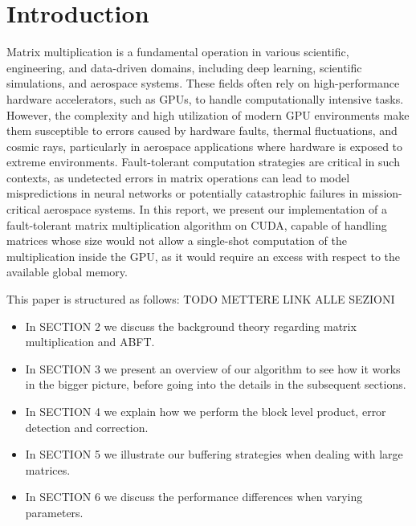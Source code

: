 \section{Introduction}

Matrix multiplication is a fundamental operation
in various scientific, engineering, and data-driven domains,
including deep learning, scientific simulations, and aerospace systems.
These fields often rely on high-performance hardware accelerators, such as GPUs,
to handle computationally intensive tasks.
However, the complexity and high utilization of modern GPU environments
make them susceptible to errors caused by hardware faults,
thermal fluctuations, and cosmic rays, particularly in aerospace applications
where hardware is exposed to extreme environments.
Fault-tolerant computation strategies are critical in such contexts,
as undetected errors in matrix operations can lead to model mispredictions
in neural networks or potentially catastrophic failures in mission-critical
aerospace systems.
In this report, we present our implementation of a fault-tolerant
matrix multiplication algorithm on CUDA, capable of handling matrices whose size would not allow a single-shot computation of the multiplication inside the GPU, as it would require an excess with respect to the available global memory.

This paper is structured as follows: TODO METTERE LINK ALLE SEZIONI
\begin{itemize}
  \item In SECTION 2 we discuss the background theory regarding matrix multiplication and ABFT.
  \item In SECTION 3 we present an overview of our algorithm to see how it works in the bigger picture, before going into the details in the subsequent sections.
  \item In SECTION 4 we explain how we perform the block level product, error detection and correction.
  \item In SECTION 5 we illustrate our buffering strategies when dealing with large matrices.
  \item In SECTION 6 we discuss the performance differences when varying parameters.
\end{itemize}
